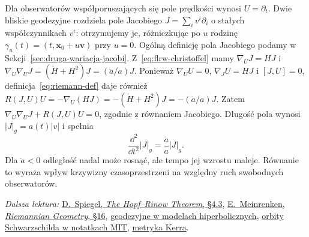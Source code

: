 \begin{przyklad}
\label{prz:flrw-jacobi}
Dla obserwatorów współporuszających się pole prędkości wynosi
$U=\partial_t$. Dwie bliskie geodezyjne rozdziela pole Jacobiego
$J=\sum_i v^i\partial_i$ o stałych współczynnikach $v^i$:
otrzymujemy je, różniczkując po $u$ rodzinę
$\gamma_u(t)=(t,\mathbf x_0+u\mathbf v)$ przy $u=0$.
Ogólną definicję pola Jacobiego podamy w
Sekcji~\ref{sec:druga-wariacja-jacobi}.
Z~\eqref{eq:flrw-christoffel} mamy
$\nabla_UJ=HJ$ i
$\nabla_U\nabla_UJ=(\dot H+H^2)J=(\ddot a/a)J$.
Ponieważ $\nabla_UU=0$, $\nabla_JU=HJ$ i
$[J,U]=0$, definicja~\eqref{eq:riemann-def}
daje również
$R(J,U)U=-\nabla_U(HJ)
=-(\dot H+H^2)J=-(\ddot a/a)J$.
Zatem
$\nabla_U\nabla_UJ+R(J,U)U=0$, zgodnie z równaniem Jacobiego.
Długość pola wynosi $|J|_g=a(t)|v|$ i spełnia
\[
 \frac{\dd^2}{\dd t^2}|J|_g
 =\frac{\ddot a}{a}|J|_g.
\]
Dla $\ddot a<0$ odległość nadal może rosnąć, ale tempo jej
wzrostu maleje. Równanie to wyraża wpływ krzywizny
czasoprzestrzeni na względny ruch swobodnych obserwatorów.
\end{przyklad}

\par\smallskip
{\footnotesize\noindent\emph{Dalsza lektura:}
\href{https://math.uchicago.edu/~may/REU2016/REUPapers/Spiegel.pdf}
{D.~Spiegel, \emph{The Hopf--Rinow Theorem}, \S4.3},
\href{https://www.math.toronto.edu/mein/teaching/LectureNotes/rieall.pdf}
{E.~Meinrenken, \emph{Riemannian Geometry}, \S16},
\href{https://math.uchicago.edu/~dannyc/courses/kleinian_groups_2015/kleinian_groups.pdf}
{geodezyjne w modelach hiperbolicznych},
\href{https://www.ocw.mit.edu/courses/8-033-relativity-fall-2006/1a22b370b6beb03149dec6e94b24a11b_lecture22_bh2.pdf}
{orbity Schwarzschilda w notatkach MIT},
\href{https://sites.science.oregonstate.edu/coursewikis/GGR/book/content/kerr}
{metryka Kerra}.\par}
